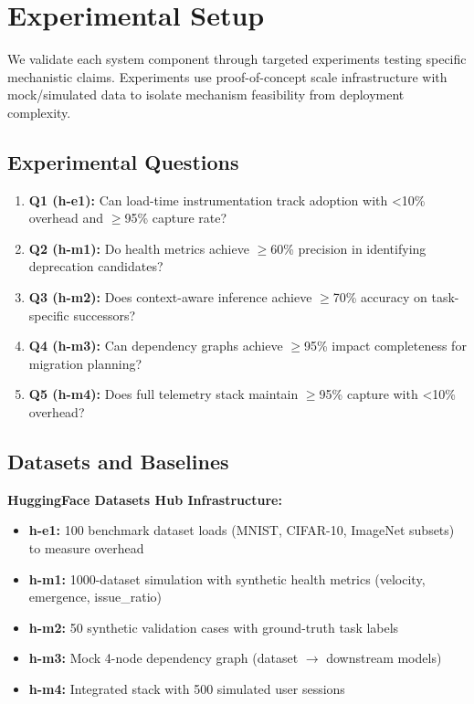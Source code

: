 \section{Experimental Setup}

We validate each system component through targeted experiments testing specific mechanistic claims. Experiments use proof-of-concept scale infrastructure with mock/simulated data to isolate mechanism feasibility from deployment complexity.

\subsection{Experimental Questions}

\begin{enumerate}
\item \textbf{Q1 (h-e1):} Can load-time instrumentation track adoption with <10\% overhead and $\geq$95\% capture rate?
\item \textbf{Q2 (h-m1):} Do health metrics achieve $\geq$60\% precision in identifying deprecation candidates?
\item \textbf{Q3 (h-m2):} Does context-aware inference achieve $\geq$70\% accuracy on task-specific successors?
\item \textbf{Q4 (h-m3):} Can dependency graphs achieve $\geq$95\% impact completeness for migration planning?
\item \textbf{Q5 (h-m4):} Does full telemetry stack maintain $\geq$95\% capture with <10\% overhead?
\end{enumerate}

\subsection{Datasets and Baselines}

\textbf{HuggingFace Datasets Hub Infrastructure:}
\begin{itemize}
\item \textbf{h-e1:} 100 benchmark dataset loads (MNIST, CIFAR-10, ImageNet subsets) to measure overhead
\item \textbf{h-m1:} 1000-dataset simulation with synthetic health metrics (velocity, emergence, issue\_ratio)
\item \textbf{h-m2:} 50 synthetic validation cases with ground-truth task labels
\item \textbf{h-m3:} Mock 4-node dependency graph (dataset $\rightarrow$ downstream models)
\item \textbf{h-m4:} Integrated stack with 500 simulated user sessions
\end{itemize}

